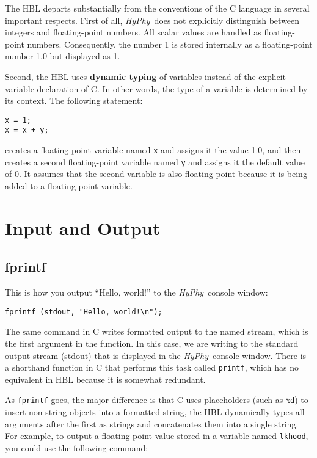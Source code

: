\documentclass[12pt]{book}
\newcommand{\hyphy}{\textit{HyPhy}}
\begin{document}
The HBL departs substantially from the conventions of the C language in several important respects.  First of all, \hyphy\ does not explicitly distinguish between integers and floating-point numbers.  All scalar values are handled as floating-point numbers.  Consequently, the number 1 is stored internally as a floating-point number 1.0 but displayed as 1.  

Second, the HBL uses {\bf dynamic typing} of variables instead of the explicit variable declaration of C.  In other words, the type of a variable is determined by its context.  The following statement:


\begin{leftbar}
\begin{verbatim}
x = 1;
x = x + y;
\end{verbatim}
\end{leftbar}

\noindent creates a floating-point variable named {\tt x} and assigns it the value 1.0, and then creates a second floating-point variable named {\tt y} and assigns it the default value of 0.  It assumes that the second variable is also floating-point because it is being added to a floating point variable.  


\section {Input and Output}\label{io}

\subsection {fprintf}
This is how you output ``Hello, world!'' to the \hyphy\ console window:

\begin{leftbar}
\begin{verbatim}
fprintf (stdout, "Hello, world!\n");
\end{verbatim}
\end{leftbar}

The same command in C writes formatted output to the named stream, which is the first argument in the function.  In this case, we are writing to the standard output stream (stdout) that is displayed in the \hyphy\ console window.  There is a shorthand function in C that performs this task called {\tt printf}, which has no equivalent in HBL because it is somewhat redundant.

As {\tt fprintf} goes, the major difference is that C uses placeholders (such as {\tt \%d}) to insert non-string objects into a formatted string, the HBL dynamically types all arguments after the first as strings and concatenates them into a single string.  For example, to output a floating point value stored in a variable named {\tt lkhood}, you could use the following command:
\end{document}
